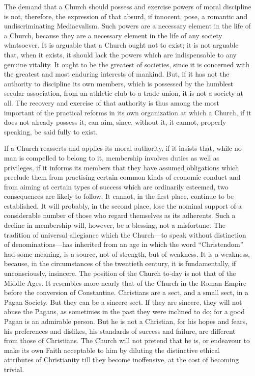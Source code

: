 \documentclass{book}
\begin{document}
The demand that a Church should possess and exercise powers of moral discipline is not, therefore, the expression of that absurd, if innocent, pose, a romantic and undiscriminating Mediaevalism. Such powers are a necessary element in the life of a Church, because they are a necessary element in the life of any society whatsoever. It is arguable that a Church ought not to exist; it is not arguable that, when it exists, it should lack the powers which are indispensable to any genuine vitality. It ought to be the greatest of societies, since it is concerned with the greatest and most enduring interests of mankind. But, if it has not the authority to discipline its own members, which is possessed by the humblest secular association, from an athletic club to a trade union, it is not a society at all. The recovery and exercise of that authority is thus among the most important of the practical reforms in its own organization at which a Church, if it does not already possess it, can aim, since, without it, it cannot, properly speaking, be said fully to exist.

If a Church reasserts and applies its moral authority, if it insists that, while no man is compelled to belong to it, membership involves duties as well as privileges, if it informs its members that they have assumed obligations which preclude them from practising certain common kinds of economic conduct and from aiming at certain types of success which are ordinarily esteemed, two consequences are likely to follow. It cannot, in the first place, continue to be established. It will probably, in the second place, lose the nominal support of a considerable number of those who regard themselves as its adherents. Such a decline in membership will, however, be a blessing, not a misfortune. The tradition of universal allegiance which the Church—to speak without distinction of denominations—has inherited from an age in which the word “Christendom” had some meaning, is a source, not of strength, but of weakness. It is a weakness, because, in the circumstances of the twentieth century, it is fundamentally, if unconsciously, insincere. The position of the Church to-day is not that of the Middle Ages. It resembles more nearly that of the Church in the Roman Empire before the conversion of Constantine. Christians are a sect, and a small sect, in a Pagan Society. But they can be a sincere sect. If they are sincere, they will not abuse the Pagans, as sometimes in the past they were inclined to do; for a good Pagan is an admirable person. But he is not a Christian, for his hopes and fears, his preferences and dislikes, his standards of success and failure, are different from those of Christians. The Church will not pretend that he is, or endeavour to make its own Faith acceptable to him by diluting the distinctive ethical attributes of Christianity till they become inoffensive, at the cost of becoming trivial.
\end{document}

